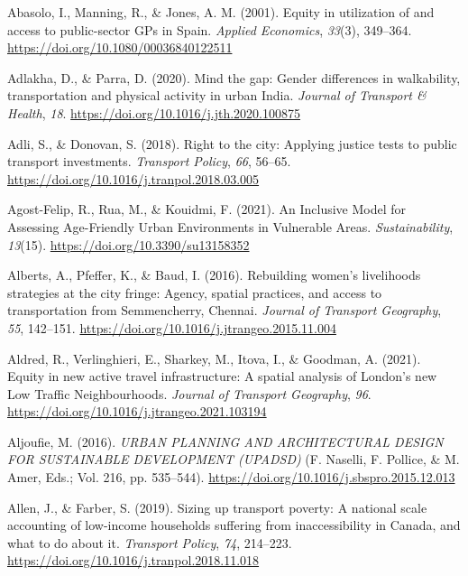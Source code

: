 \documentclass[
  letterpaper,
  DIV=11,
  numbers=noendperiod]{scrartcl}
\newlength{\cslhangindent}
\newenvironment{CSLReferences}[2] %
 {\begin{list}{}{%
  \setlength{\itemindent}{0pt}
  \setlength{\leftmargin}{0pt}
  \setlength{\parsep}{0pt}
  \ifodd #1
   \setlength{\leftmargin}{\cslhangindent}
   \setlength{\itemindent}{-1\cslhangindent}
  \fi
  \setlength{\itemsep}{#2\baselineskip}}}
 {\end{list}}
\begin{document}
\label{refs}
\begin{CSLReferences}{1}{0}
Abasolo, I., Manning, R., \& Jones, A. M. (2001). Equity in utilization
of and access to public-sector {GPs} in {Spain}. \emph{Applied
Economics}, \emph{33}(3), 349--364.
\url{https://doi.org/10.1080/00036840122511}

Adlakha, D., \& Parra, D. (2020). Mind the gap: {Gender} differences in
walkability, transportation and physical activity in urban {India}.
\emph{Journal of Transport \& Health}, \emph{18}.
\url{https://doi.org/10.1016/j.jth.2020.100875}

Adli, S., \& Donovan, S. (2018). Right to the city: {Applying} justice
tests to public transport investments. \emph{Transport Policy},
\emph{66}, 56--65. \url{https://doi.org/10.1016/j.tranpol.2018.03.005}

Agost-Felip, R., Rua, M., \& Kouidmi, F. (2021). An {Inclusive Model}
for {Assessing Age-Friendly Urban Environments} in {Vulnerable Areas}.
\emph{Sustainability}, \emph{13}(15).
\url{https://doi.org/10.3390/su13158352}

Alberts, A., Pfeffer, K., \& Baud, I. (2016). Rebuilding women's
livelihoods strategies at the city fringe: {Agency}, spatial practices,
and access to transportation from {Semmencherry}, {Chennai}.
\emph{Journal of Transport Geography}, \emph{55}, 142--151.
\url{https://doi.org/10.1016/j.jtrangeo.2015.11.004}

Aldred, R., Verlinghieri, E., Sharkey, M., Itova, I., \& Goodman, A.
(2021). Equity in new active travel infrastructure: {A} spatial analysis
of {London}'s new {Low Traffic Neighbourhoods}. \emph{Journal of
Transport Geography}, \emph{96}.
\url{https://doi.org/10.1016/j.jtrangeo.2021.103194}

Aljoufie, M. (2016). \emph{URBAN PLANNING AND ARCHITECTURAL DESIGN FOR
SUSTAINABLE DEVELOPMENT (UPADSD)} (F. Naselli, F. Pollice, \& M. Amer,
Eds.; Vol. 216, pp. 535--544).
\url{https://doi.org/10.1016/j.sbspro.2015.12.013}

Allen, J., \& Farber, S. (2019). Sizing up transport poverty: {A}
national scale accounting of low-income households suffering from
inaccessibility in {Canada}, and what to do about it. \emph{Transport
Policy}, \emph{74}, 214--223.
\url{https://doi.org/10.1016/j.tranpol.2018.11.018}


\end{CSLReferences}
\end{document}
